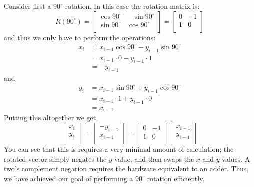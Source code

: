 Consider first a $90^\circ$ rotation. In this case the rotation matrix is:
\begin{equation}
R(90^\circ) = \begin{bmatrix}
\cos 90^\circ & -\sin 90^\circ \\
\sin 90^\circ & \cos 90^\circ \\
\end{bmatrix} = \begin{bmatrix}
0 & -1 \\
1 & 0 \\
\end{bmatrix} 
\end{equation} and thus we only have to perform the operations:
\begin{align}
x_i &= x_{i-1}  \cos 90^\circ - y_{i-1} \sin 90^\circ \nonumber \\
& = x_{i-1} \cdot 0 - y_{i-1} \cdot 1 \nonumber \\
& = -y_{i-1}\
\end{align}
and 
\begin{align}
y_i &= x_{i-1} \sin  90^\circ + y_{i-1} \cos 90^\circ \nonumber \\
& = x_{i-1} \cdot 1 + y_{i-1} \cdot 0 \nonumber \\
&=  x_{i-1}\
\end{align}
Putting this altogether we get
\begin{equation}
  \begin{bmatrix}
x_i \\
y_i \\
\end{bmatrix} 
=
\begin{bmatrix}
-y_{i-1} \\
x_{i-1} \\
\end{bmatrix} 
=
\begin{bmatrix}
0 & -1 \\
1 & 0 \\
\end{bmatrix}\begin{bmatrix}
x_{i-1} \\
y_{i-1} \\
\end{bmatrix}
\end{equation}
You can see that this is requires a very minimal amount of calculation; the rotated vector simply negates the $y$ value, and then swaps the $x$ and $y$ values. A two's complement negation requires the hardware equivalent to an adder. Thus, we have achieved our goal of performing a $90^\circ$ rotation efficiently.

